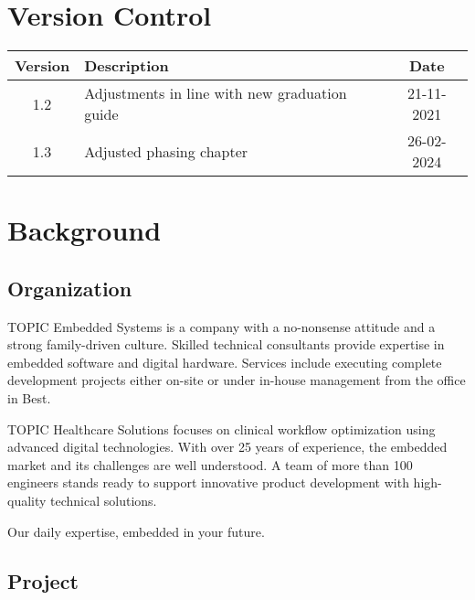 \documentclass{article}
\begin{document}
\newpage

\section*{Version Control}

\begin{tabular}{|c|l|c|}
    \hline
    Version & Description & Date \\
    \hline
    1.2 & Adjustments in line with new graduation guide & 21-11-2021 \\
    1.3 & Adjusted phasing chapter & 26-02-2024 \\
    \hline
\end{tabular}

\newpage

\tableofcontents

\newpage
\section{Background}


\subsection{Organization}

TOPIC Embedded Systems is a company with a no-nonsense attitude and a strong
family-driven culture. Skilled technical consultants provide expertise in
embedded software and digital hardware. Services include executing complete
development projects either on-site or under in-house management from the office
in Best.

TOPIC Healthcare Solutions focuses on clinical workflow optimization using
advanced digital technologies. With over 25 years of experience, the embedded
market and its challenges are well understood. A team of more than 100 engineers
stands ready to support innovative product development with high-quality
technical solutions.

Our daily expertise, embedded in your future.
\subsection{Project}\label{project-background}

\end{document}

